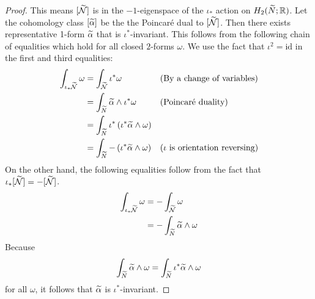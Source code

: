 \begin{proof}
  This means $[\widetilde{\mathcal{N}}]$ is in the $-1$-eigenspace of the $\iota_{\ast}$ action on $H_2(\widetilde{N}; \mathbb{R})$.
  Let the cohomology class $[\widetilde{\alpha}]$ be the the Poincar\'e dual to $[\widetilde{\mathcal{N}}]$.
  Then there exists representative 1-form $\widetilde{\alpha}$ that is $\iota^{\ast}$-invariant.
  This follows from the following chain of equalities which hold for all closed $2$-forms $\omega$.
  We use the fact that $\iota^2= \mathrm{id}$ in the first and third equalities:
  \begin{align*}
    \int_{\iota_{\ast}\widetilde{\mathcal{N}}} \omega &= \int_{\widetilde{\mathcal{N}}} \iota^{\ast}\omega &&\text{(By a change of variables)} \\
                                     &= \int_{\widetilde{N}} \widetilde{\alpha} \wedge \iota^{\ast} \omega &&\text{(Poincar\'e duality)} \\
                                     &=\int_{\widetilde{N}} \iota^{\ast} \left( \iota^{\ast}\widetilde{\alpha} \wedge \omega \right) \\
    &= \int_{\widetilde{N}} - \left( \iota^{\ast} \widetilde{\alpha} \wedge \omega \right) &&\text{($\iota$ is orientation reversing)}
  \end{align*}
  On the other hand, the following equalities follow from the fact that $\iota_{\ast}[\widetilde{\mathcal{N}}] = -[\widetilde{\mathcal{N}}]$.
  \begin{align*}
    \int_{\iota_{\ast}\widetilde{\mathcal{N}}} \omega &= - \int_{\widetilde{\mathcal{N}}} \omega \\
                              &= - \int_{\widetilde{N}} \widetilde{\alpha} \wedge \omega
  \end{align*}
  Because $$\int_{\widetilde{N}}\widetilde{\alpha}\wedge\omega=\int_{\widetilde{N}}\iota^\ast\widetilde{\alpha}\wedge\omega$$ for all $\omega$, it follows that $\widetilde{\alpha}$ is
  $\iota^{\ast}$-invariant.
\end{proof}

